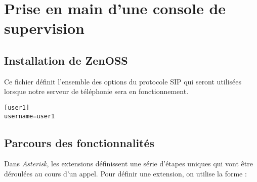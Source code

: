 \documentclass[12pt,a4paper,notitlepage]{article}
\begin{document}
\section{Prise en main d'une console de supervision}
\subsection{Installation de ZenOSS}
Ce fichier définit l'ensemble des options du protocole SIP qui seront utilisées lorsque notre serveur de téléphonie sera en fonctionnement. \\
\begin{lstlisting}[title=sip.conf v1]
[user1]
username=user1
\end{lstlisting}

\subsection{Parcours des fonctionnalités}

Dans \textit{Asterisk}, les extensions définissent une série d'étapes uniques qui vont être déroulées au cours d'un appel. Pour définir une extension, on utilise la forme : \\

\end{document}
